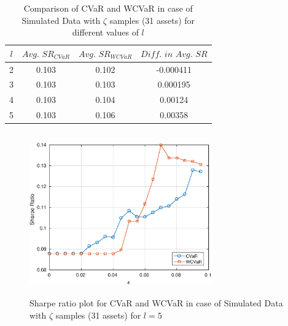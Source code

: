 \begin{table}[!h]
    \centering
    \captionsetup{justification=centering}

   \begin{tabular}{||c|c|c|c||}
   \hline
  
$l$ & $Avg. \, \, SR_{CVaR}$ & $Avg. \, \, SR_{WCVaR}$ & $Diff. \, \, in \, \, Avg. \, \, SR$ \\
  
  \hline
2 & 0.103 & 0.102 & -0.000411 \\
3 & 0.103 & 0.103 & 0.000195 \\
4 & 0.103 & 0.104 & 0.00124 \\
5 & 0.103 & 0.106 & 0.00358 \\
  \hline
\end{tabular}
    \caption{Comparison of CVaR and WCVaR in case of Simulated Data with $\zeta$ samples (31 assets) for different values of $l$}
    \label{avgtab:6.2}
\end{table}

\begin{figure}[!h]
    \centering
   
    \includegraphics[height=7.0cm,width=0.7\textwidth]{CVaR/bse30_simulated/sr_exact_5.eps}

   \caption{Sharpe ratio plot for CVaR and WCVaR in case of Simulated Data with $\zeta$ samples (31 assets) for $l=5$}
   \label{fig:6.2}
\end{figure}

